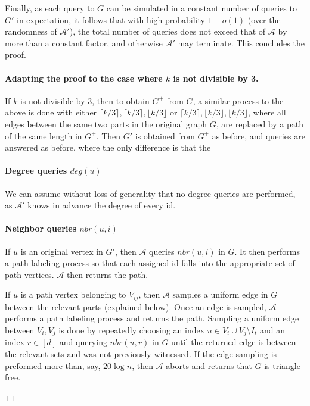 \documentclass{article}
\newcommand{\calA}{{\mathcal{A}}}
\newcommand{\mA}{{\mathcal{A}}}
\newcommand{\trG}{{G'}}
\newcommand{\trA}{{\calA'}}
\newenvironment{proofof}[1]{\smallskip\noindent{\bf Proof of #1:}}%
        {\hspace*{\fill}$\Box$\par}
\newcommand{\commentt}[1]{ {}}
\begin{document}
\begin{proofof}{Theorem~\ref{thm:lb_ck_const_alpha}}
\bigskip
Finally, as each query to $G$ can be simulated in a constant number of queries to $\trG$ in expectation, it follows that with high probability $1-o(1)$ (over the randomness of $\trA$), the total number of queries does not exceed that of $\mA$ by more than a constant factor, %
and otherwise $\trA$ may terminate.
  This concludes the proof.
\iffalse
\paragraph{Adapting the proof to the case where $k$ is not divisible by 3.}
If $k$ is not divisible by $3$, then  to obtain $G^+$ from $G$, 
a similar process to the above is done with either $\lceil k/3\rceil, \lceil k/3\rceil, \lfloor k/3\rfloor$ or $\lceil k/3\rceil, \lfloor k/3\rfloor, \lfloor k/3\rfloor$, where all edges between the same two parts in the original graph $G$, are replaced by a path of the same length in $G^+$.
Then $G'$ is obtained from $G^+$ as before, and queries are answered as before, where the only difference is that the 

\paragraph{Degree queries $deg(u)$}
We can assume without loss of generality that no degree queries are performed, as $\mA'$ knows in advance the degree of every id. 
\commentt{This is different from what we had before. I think we should try to unify. I guess the first case should be made more similar to this one}

\paragraph{Neighbor queries $nbr(u, i)$}
If $u$ is an original vertex in $G'$, then $\mA$ queries $nbr(u,i)$ in $G$. It then performs a path labeling process so that each assigned id falls into the appropriate set of path vertices.  $\mA$ then returns the path.

If $u$ is a path vertex belonging to $V_{ij}$, then $\mA$ samples a uniform edge in $G$ between the relevant parts (explained below). Once an edge is sampled, $\mA$  performs a path labeling process and returns the path.
Sampling a uniform edge between $V_i, V_j$ is done by repeatedly choosing an index  $u\in V_i\cup V_j \setminus I_t$ and an index $r\in [d]$ and querying $nbr(u,r)$ in $G$ until the returned edge is between the relevant sets and was not previously witnessed.  If the edge sampling is preformed more than, say, $20\log n$, then $\mA$ aborts and returns that $G$ is triangle-free. 


\end{proofof}
\end{document}

